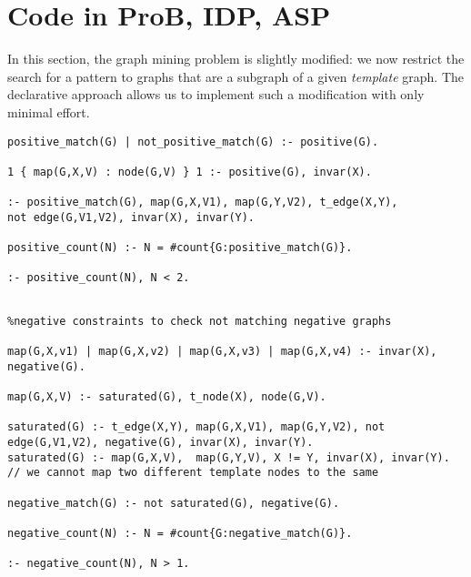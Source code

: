 \section{Code in ProB, IDP, ASP}\label{sec:code}
In this section, the graph mining problem is slightly modified: we now restrict the search for a pattern to graphs that are a subgraph of a given \emph{template} graph.
The declarative approach allows us to implement such a modification with only minimal effort.
\pagebreak



\lstset{basicstyle=\footnotesize\ttfamily,breaklines=true}
\begin{lstlisting}[caption=ASP positive matching, style=model]
positive_match(G) | not_positive_match(G) :- positive(G).

1 { map(G,X,V) : node(G,V) } 1 :- positive(G), invar(X).

:- positive_match(G), map(G,X,V1), map(G,Y,V2), t_edge(X,Y), 
not edge(G,V1,V2), invar(X), invar(Y).

positive_count(N) :- N = #count{G:positive_match(G)}.

:- positive_count(N), N < 2.
\end{lstlisting}

\begin{lstlisting}[caption=ASP negative matching, style=model]
%Saturated Representation

%negative constraints to check not matching negative graphs

map(G,X,v1) | map(G,X,v2) | map(G,X,v3) | map(G,X,v4) :- invar(X), negative(G).

map(G,X,V) :- saturated(G), t_node(X), node(G,V).

saturated(G) :- t_edge(X,Y), map(G,X,V1), map(G,Y,V2), not edge(G,V1,V2), negative(G), invar(X), invar(Y).
saturated(G) :- map(G,X,V),  map(G,Y,V), X != Y, invar(X), invar(Y). // we cannot map two different template nodes to the same 

negative_match(G) :- not saturated(G), negative(G).

negative_count(N) :- N = #count{G:negative_match(G)}.

:- negative_count(N), N > 1.

\end{lstlisting}

